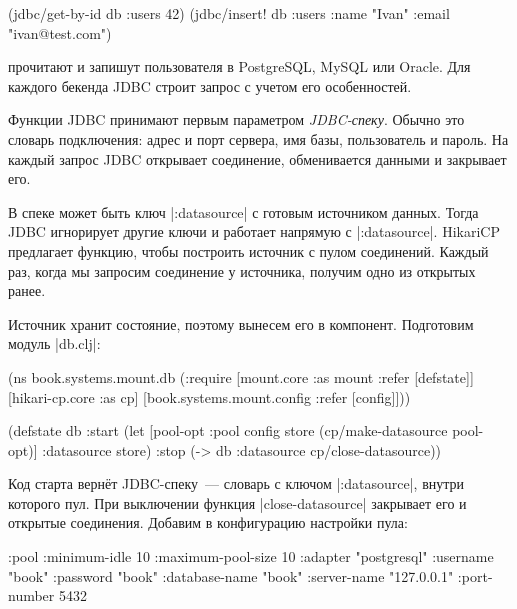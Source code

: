 \begin{english}
  \begin{clojure}
(jdbc/get-by-id db :users 42)
(jdbc/insert! db :users {:name "Ivan" :email "ivan@test.com"})
  \end{clojure}
\end{english}

\noindent
прочитают и запишут пользователя в PostgreSQL, MySQL или Oracle. Для каждого
бекенда JDBC строит запрос с учетом его особенностей.

Функции JDBC принимают первым параметром \emph{JDBC-спеку}. Обычно это словарь
подключения: адрес и порт сервера, имя базы, пользователь и пароль. На каждый
запрос JDBC открывает соединение, обменивается данными и закрывает его.

В спеке может быть ключ \spverb|:datasource| с готовым источником
данных. Тогда JDBC игнорирует другие ключи и работает напрямую с
\spverb|:datasource|. HikariCP предлагает функцию, чтобы построить источник с
пулом соединений. Каждый раз, когда мы запросим соединение у источника, получим
одно из открытых ранее.

Источник хранит состояние, поэтому вынесем его в компонент. Подготовим модуль
\spverb|db.clj|:

\begin{english}
  \begin{clojure}
(ns book.systems.mount.db
  (:require
   [mount.core :as mount :refer [defstate]]
   [hikari-cp.core :as cp]
   [book.systems.mount.config :refer [config]]))

(defstate db
  :start
  (let [{pool-opt :pool} config
        store (cp/make-datasource pool-opt)]
    {:datasource store})
  :stop
  (-> db :datasource cp/close-datasource))
  \end{clojure}
\end{english}

Код старта верн\"{е}т JDBC-спеку~--- словарь с ключом \spverb|:datasource|, внутри
которого пул. При выключении функция \spverb|close-datasource| закрывает его и
открытые соединения. Добавим в конфигурацию настройки пула:

\begin{english}
  \begin{clojure}
{:pool {:minimum-idle       10
        :maximum-pool-size  10
        :adapter            "postgresql"
        :username           "book"
        :password           "book"
        :database-name      "book"
        :server-name        "127.0.0.1"
        :port-number        5432}}
  \end{clojure}
\end{english}


